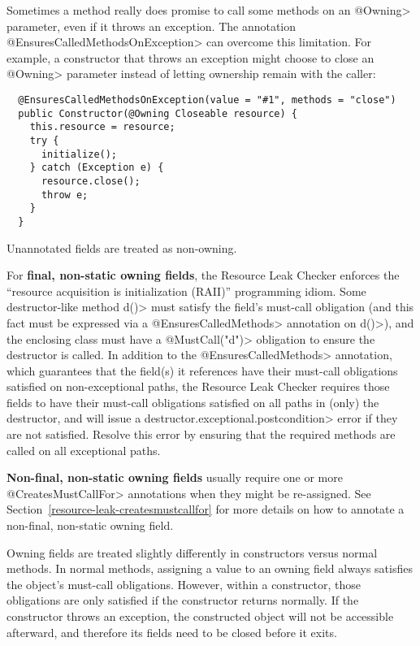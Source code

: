 Sometimes a method really does promise to call some methods on an \<@Owning> parameter,
even if it throws an exception.  The annotation \<@EnsuresCalledMethodsOnException> can
overcome this limitation.  For example, a constructor that throws an exception might
choose to close an \<@Owning> parameter instead of letting ownership remain with the caller:

\begin{verbatim}
  @EnsuresCalledMethodsOnException(value = "#1", methods = "close")
  public Constructor(@Owning Closeable resource) {
    this.resource = resource;
    try {
      initialize();
    } catch (Exception e) {
      resource.close();
      throw e;
    }
  }
\end{verbatim}


Unannotated fields are treated as non-owning.

For \textbf{final, non-static owning fields},
the Resource Leak Checker enforces the ``resource acquisition is
initialization (RAII)'' programming idiom.  Some
destructor-like method \<d()> must satisfy the field's must-call obligation
(and this fact must be expressed via a \<@EnsuresCalledMethods> annotation on \<d()>),
and the enclosing class must have a \<@MustCall("d")> obligation to
ensure the destructor is called. In addition to the \<@EnsuresCalledMethods> annotation,
which guarantees that the field(s) it references have their must-call obligations satisfied
on non-exceptional paths, the Resource Leak Checker requires those fields to have their must-call
obligations satisfied on all paths in (only) the destructor, and will issue a \<destructor.exceptional.postcondition>
error if they are not satisfied. Resolve this error by ensuring that the required methods are called
on all exceptional paths.

\textbf{Non-final, non-static owning fields} usually require one or more \<@CreatesMustCallFor> annotations
when they might be re-assigned. See Section~\ref{resource-leak-createsmustcallfor} for
more details on how to annotate a non-final, non-static owning field.

Owning fields are treated slightly differently in constructors versus normal methods.
In normal methods, assigning a value to an owning field always satisfies the object's
must-call obligations.  However, within a constructor, those obligations are only
satisfied if the constructor returns normally.  If the constructor throws an exception,
the constructed object will not be accessible afterward, and therefore its fields need
to be closed before it exits.

